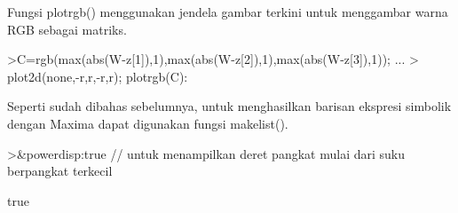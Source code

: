 \documentclass[a4paper,10pt]{article}
\begin{document}
\begin{eulernotebook}
\begin{eulercomment}
\begin{eulercomment}
\begin{eulercomment}
\begin{eulercomment}
\begin{eulercomment}
\begin{eulercomment}
\begin{eulercomment}
Fungsi plotrgb() menggunakan jendela gambar terkini untuk menggambar warna RGB sebagai
matriks.
\end{eulercomment}
\begin{eulerprompt}
>C=rgb(max(abs(W-z[1]),1),max(abs(W-z[2]),1),max(abs(W-z[3]),1)); ...
>  plot2d(none,-r,r,-r,r); plotrgb(C):
\end{eulerprompt}
\begin{eulercomment}
Seperti sudah dibahas sebelumnya, untuk menghasilkan barisan ekspresi simbolik dengan Maxima
dapat digunakan fungsi makelist().
\end{eulercomment}
\begin{eulerprompt}
>&powerdisp:true // untuk menampilkan deret pangkat mulai dari suku berpangkat terkecil
\end{eulerprompt}
\begin{euleroutput}
  
                                   true
  

\end{euleroutput}
\end{eulercomment}
\end{eulercomment}
\end{eulercomment}
\end{eulercomment}
\end{eulercomment}
\end{eulercomment}
\end{eulernotebook}
\end{document}
